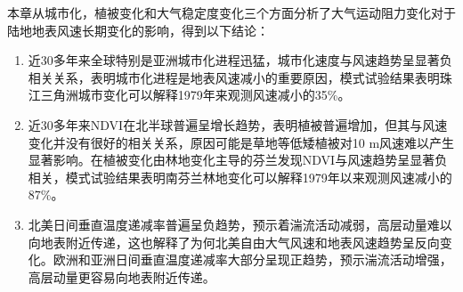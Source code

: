 本章从城市化，植被变化和大气稳定度变化三个方面分析了大气运动阻力变化对于陆地地表风速长期变化的影响，得到以下结论：

\begin{enumerate}

\item 近30多年来全球特别是亚洲城市化进程迅猛，城市化速度与风速趋势呈显著负相关关系，表明城市化进程是地表风速减小的重要原因，模式试验结果表明珠江三角洲城市变化可以解释1979年来观测风速减小的35\%。

\item 近30多年来NDVI在北半球普遍呈增长趋势，表明植被普遍增加，但其与风速变化并没有很好的相关关系，原因可能是草地等低矮植被对10 m风速难以产生显著影响。在植被变化由林地变化主导的芬兰发现NDVI与风速趋势呈显著负相关，模式试验结果表明南芬兰林地变化可以解释1979年以来观测风速减小的87\%。

\item 北美日间垂直温度递减率普遍呈负趋势，预示着湍流活动减弱，高层动量难以向地表附近传递，这也解释了为何北美自由大气风速和地表风速趋势呈反向变化。欧洲和亚洲日间垂直温度递减率大部分呈现正趋势，预示湍流活动增强，高层动量更容易向地表附近传递。

\end{enumerate}